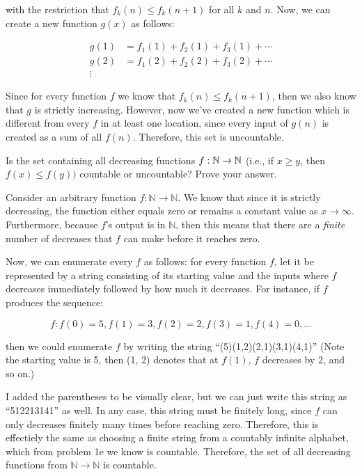 \documentclass[11pt]{article}
\begin{document}
\begin{Parts}
\begin{solution}
      with the restriction that $f_k(n) \le f_k(n+1)$ for all $k$ and $n$. Now, we can create a new function $g(x)$ as follows: 

      \begin{align*}
        g(1) &= f_1(1) + f_2(1) + f_3(1) + \cdots \\
        g(2) &= f_1(2) + f_2(2) + f_3(2) + \cdots\\
        \vdots
      \end{align*}

      Since for every function $f$ we know that $f_k(n) \le f_k(n+1)$, then we also know that $g$ is strictly increasing. However, now we've created a new function which is different from every $f$ in at least one location, since every input of $g(n)$ is created as a sum of all $f(n)$. Therefore, this set is uncountable.
    \end{solution}
    
    \Part
    Is the set containing all decreasing functions $f : \mathbb{N} \rightarrow \mathbb{N}$ (i.e., if $x \geq y$, then $f(x) \leq f(y))$ countable or uncountable? Prove your answer.

    \begin{solution}
      Consider an arbitrary function $f: \mathbb N \to \mathbb N$. We know that since it is strictly decreasing, the function either equals zero or remains a constant value as $x \to \infty$. Furthermore, because $f$'s output is in $\mathbb N$, then this means that there are a \textit{finite} number of decreases that $f$ can make before it reaches zero. 

      Now, we can enumerate every $f$ as follows: for every function $f$, let it be represented by a string consisting of its starting value and the inputs where $f$ decreases immediately followed by how much it decreases. For instance, if $f$ produces the sequence: 

      \[ f: f(0) = 5, f(1) = 3, f(2) = 2, f(3) = 1, f(4) = 0, \dots\]

      then we could enumerate $f$ by writing the string ``(5)(1,2)(2,1)(3,1)(4,1)'' (Note the starting value is 5, then (1, 2) denotes that at $f(1)$, $f$ decreases by 2, and so on.)
      
      I added the parentheses to be visually clear, but we can just write this string as ``512213141'' as well. In any case, this string must be finitely long, since $f$ can only decreases finitely many times before reaching zero. Therefore, this is effectiely the same as choosing a finite string from a countably infinite alphabet, which from problem 1e we know is countable. Therefore, the set of all decreasing functions from $\mathbb N \to \mathbb N$ is countable.
    \end{solution}
\end{Parts}
\pagebreak
{}
\end{document}
